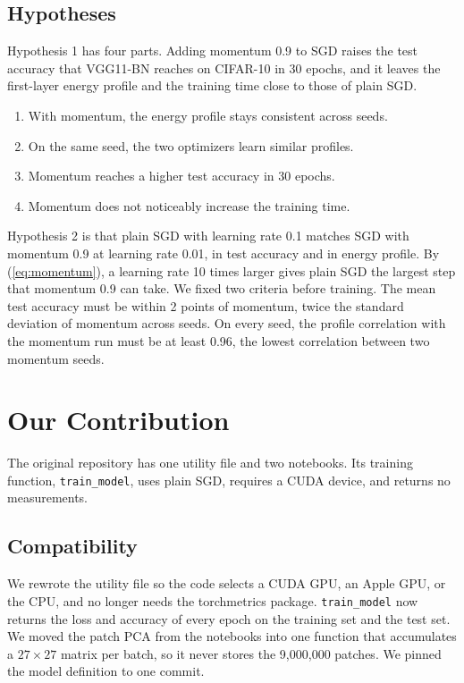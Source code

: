 \documentclass[conference]{IEEEtran}
\begin{document}
\subsection{Hypotheses}
Hypothesis 1 has four parts. Adding momentum 0.9 to SGD raises the test
accuracy that VGG11-BN reaches on CIFAR-10 in 30 epochs, and it leaves the
first-layer energy profile and the training time close to those of plain SGD.
\begin{enumerate}
\item With momentum, the energy profile stays consistent across seeds.
\item On the same seed, the two optimizers learn similar profiles.
\item Momentum reaches a higher test accuracy in 30 epochs.
\item Momentum does not noticeably increase the training time.
\end{enumerate}

Hypothesis 2 is that plain SGD with learning rate 0.1 matches SGD with
momentum 0.9 at learning rate 0.01, in test accuracy and in energy profile. By
(\ref{eq:momentum}), a learning rate 10 times larger gives plain SGD the
largest step that momentum 0.9 can take. We fixed two criteria before
training. The mean test accuracy must be within 2 points of momentum, twice
the standard deviation of momentum across seeds. On every seed, the profile
correlation with the momentum run must be at least 0.96, the lowest
correlation between two momentum seeds.

\section{Our Contribution}
The original repository has one utility file and two notebooks. Its training
function, \texttt{train\_model}, uses plain SGD, requires a CUDA device, and
returns no measurements.

\subsection{Compatibility}
We rewrote the utility file so the code selects a CUDA GPU, an Apple GPU, or
the CPU, and no longer needs the torchmetrics package. \texttt{train\_model}
now returns the loss and accuracy of every epoch on the training set and the
test set. We moved the patch PCA from the notebooks into one function that
accumulates a $27\times27$ matrix per batch, so it never stores the 9,000,000
patches. We pinned the model definition \cite{chen2021} to one commit.
\end{document}
